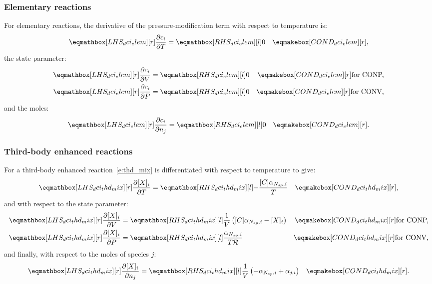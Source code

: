 \documentclass[12pt,number,sort&compress]{elsarticle}
\newcommand{\ns}{N_{sp}}
\newcommand{\conp}{CONP}
\newcommand{\conv}{CONV}
\newcommand{\dconp}{\ifmmode\text{for \conp,}\else for \conp,\fi}
\newcommand{\dconv}{\ifmmode\text{for \conv,}\else for \conv,\fi}
\newcommand{\Ru}{\mathcal{R}}
\begin{document}
\subsubsection{Elementary reactions}
For elementary reactions, the derivative of the pressure-modification term with respect to temperature is:
\begin{align}
\lhs{dci_elem}{\frac{\partial c_{i} }{\partial T }} &= \rhs{dci_elem}{0} & \cond{dci_elem}{,} \label{e:dci_elem_dt}
\end{align}
the state parameter:
\begin{subequations}
 \label{e:dci_elem_de}
 \begin{align}
  \lhs{dci_elem}{\frac{\partial c_{i} }{\partial V }} &= \rhs{dci_elem}{0} & \cond{dci_elem}{\dconp} \\
  \lhs{dci_elem}{\frac{\partial c_{i} }{\partial P }} &= \rhs{dci_elem}{0} & \cond{dci_elem}{\dconv}
 \end{align}
\end{subequations}
and the moles:
\begin{align}
 \lhs{dci_elem}{\frac{\partial c_{i} }{\partial {n_j} }} &= \rhs{dci_elem}{0} & \cond{dci_elem}{.} \label{e:dci_elem_dnj}
\end{align}


\subsubsection{Third-body enhanced reactions}
For a third-body enhanced reaction~\cref{e:thd_mix} is differentiated with respect to temperature to give:
\begin{align}
 \label{e:dci_thd_dt}
 \lhs{dci_thd_mix}{\frac{\partial [X]_i }{\partial T }} &= \rhs{dci_thd_mix}{-\frac{[C] \alpha_{\ns,i}}{T}} & \cond{dci_thd_mix}{,}
\end{align}
and with respect to the state parameter:
\begin{subequations}
 \label{e:dci_thd_de}
 \begin{align}
 \lhs{dci_thd_mix}{\frac{\partial [X]_i }{\partial V }} &= \rhs{dci_thd_mix}{\frac{1}{V} \left([C] \alpha_{\ns,i} - [X]_{i}\right)} & \cond{dci_thd_mix}{\dconp}\\
 \lhs{dci_thd_mix}{\frac{\partial [X]_i }{\partial P }} &= \rhs{dci_thd_mix}{\frac{\alpha_{\ns,i}}{T \Ru}} & \cond{dci_thd_mix}{\dconv}
 \end{align}
\end{subequations}
and finally, with respect to the moles of species $j$:
\begin{align}
\label{e:dci_thd_dnj}
\lhs{dci_thd_mix}{\frac{\partial [X]_i }{\partial n_{j}}} &= \rhs{dci_thd_mix}{\frac{1}{V} \left(- \alpha_{\ns,i} + \alpha_{j,i}\right)} & \cond{dci_thd_mix}{.}
\end{align}
\end{document}
